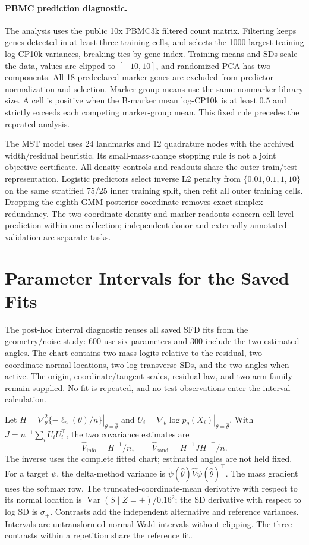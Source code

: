 \paragraph{PBMC prediction diagnostic.}
The analysis uses the public 10x PBMC3k filtered count matrix. Filtering keeps
genes detected in at least three
training cells, and selects the 1000 largest training log-CP10k variances,
breaking ties by gene index. Training means and SDs scale the data, values
are clipped to $[-10,10]$, and randomized PCA has two components. All
18 predeclared marker genes are excluded from predictor normalization and
selection. Marker-group means use the same nonmarker library size. A cell is
positive when the B-marker mean log-CP10k is at least $0.5$ and strictly
exceeds each competing marker-group mean. This fixed rule precedes the
repeated analysis.

The MST model uses 24 landmarks and 12 quadrature nodes with the archived
width/residual heuristic. Its small-mass-change stopping rule is not a joint
objective certificate. All density controls and readouts share the outer
train/test representation. Logistic predictors select inverse L2 penalty
from $\{0.01,0.1,1,10\}$ on the same stratified 75/25 inner training split,
then refit all outer training cells. Dropping the eighth GMM posterior
coordinate removes exact simplex redundancy. The two-coordinate density and
marker readouts concern cell-level prediction within one collection;
independent-donor and externally annotated validation are separate tasks.

\section{Parameter Intervals for the Saved Fits}
\label{app:intervals}
The post-hoc interval diagnostic reuses all \GeoFitCount{} saved SFD fits
from the geometry/noise study: 600 use six parameters and 300 include the
two estimated angles. The chart contains two mass logits relative to the
residual, two coordinate-normal locations, two log transverse SDs, and the
two angles when active. The origin, coordinate/tangent scales, residual law,
and two-arm family remain supplied. No fit is repeated, and no test
observations enter the interval calculation.

Let $H=\left.\nabla_\theta^2\{-\ell_n(\theta)/n\}\right|_{\theta=\hat\theta}$
and $U_i=\left.\nabla_\theta\log p_\theta(X_i)\right|_{\theta=\hat\theta}$.
With $J=n^{-1}\sum_i U_iU_i^\top$, the two covariance estimates are
\[
 \widehat V_{\mathrm{info}}=H^{-1}/n,\qquad
 \widehat V_{\mathrm{sand}}=H^{-1}JH^{-\top}/n.
\]
The inverse uses the complete fitted chart; estimated angles are not held
fixed. For a target $\psi$, the delta-method variance is
$\dot\psi(\hat\theta)\widehat V\dot\psi(\hat\theta)^\top$.
The mass gradient uses the softmax row. The truncated-coordinate-mean
derivative with respect to its normal location is
$\operatorname{Var}(S\mid Z=+)/0.16^2$; the SD derivative with respect to
log SD is $\sigma_+$. Contrasts add the independent alternative and reference
variances. Intervals are untransformed normal Wald intervals without clipping.
The three contrasts within a repetition share the reference fit.

